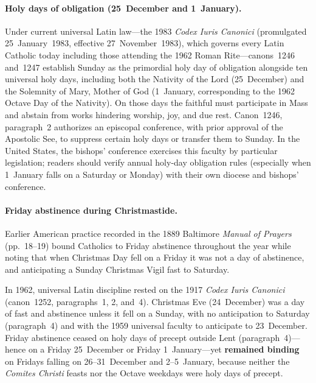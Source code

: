 \paragraph{Holy days of obligation (25~December and 1~January).}
Under current universal Latin law---the 1983 \textit{Codex Iuris Canonici}
(promulgated 25~January~1983, effective 27~November~1983), which governs every
Latin Catholic today including those attending the 1962 Roman Rite---canons~1246
and~1247 establish Sunday as the primordial holy day of obligation alongside ten
universal holy days, including both the Nativity of the Lord (25~December) and
the Solemnity of Mary, Mother of God (1~January, corresponding to the 1962
Octave Day of the Nativity). On those days the faithful must participate in Mass
and abstain from works hindering worship, joy, and due rest. Canon~1246,
paragraph~2 authorizes an episcopal conference, with prior approval of the
Apostolic See, to suppress certain holy days or transfer them to Sunday. In the
United States, the bishops' conference exercises this faculty by particular
legislation; readers should verify annual holy-day obligation rules (especially
when 1~January falls on a Saturday or Monday) with their own diocese and
bishops' conference.

\paragraph{Friday abstinence during Christmastide.}
Earlier American practice recorded in the 1889 Baltimore \textit{Manual of
Prayers} (pp.~18--19) bound Catholics to Friday abstinence throughout the year
while noting that when Christmas Day fell on a Friday it was not a day of
abstinence, and anticipating a Sunday Christmas Vigil fast to Saturday.

In 1962, universal Latin discipline rested on the 1917 \textit{Codex Iuris
Canonici} (canon~1252, paragraphs~1, 2, and~4). Christmas Eve (24~December) was
a day of fast and abstinence unless it fell on a Sunday, with no anticipation to
Saturday (paragraph~4) and with the 1959 universal faculty to anticipate to
23~December. Friday abstinence ceased on holy days of precept outside Lent
(paragraph~4)---hence on a Friday 25~December or Friday 1~January---yet
\textbf{remained binding} on Fridays falling on 26--31~December and 2--5~January,
because neither the \textit{Comites Christi} feasts nor the Octave weekdays were
holy days of precept.

